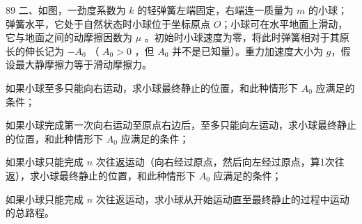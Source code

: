 \begin{problem}[第35届全国中学生物理竞赛复赛][弹簧振子与摩擦力]{89}
二、如图，一劲度系数为 $k$ 的轻弹簧左端固定，右端连一质量为 $m$ 的小球；弹簧水平，它处于自然状态时小球位于坐标原点 $O$；小球可在水平地面上滑动，它与地面之间的动摩擦因数为 $\mu$ 。初始时小球速度为零，将此时弹簧相对于其原长的伸长记为 $-A_{0}$ （ $A_{0}>0$ ，但 $A_{0}$ 并不是已知量）。重力加速度大小为 $g$，假设最大静摩擦力等于滑动摩擦力。
\begin{subproblem}
如果小球至多只能向右运动，求小球最终静止的位置，和此种情形下 $A_0$ 应满足的条件；
\end{subproblem}
\begin{subproblem}
如果小球完成第一次向右运动至原点右边后，至多只能向左运动，求小球最终静止的位置，和此种情形下 $A_{0}$ 应满足的条件；
\end{subproblem}
\begin{subproblem}
如果小球只能完成 $n$ 次往返运动（向右经过原点，然后向左经过原点，算1次往返），求小球最终静止的位置，和此种情形下 $A_{0}$ 应满足的条件；
\end{subproblem}
\begin{subproblem}
如果小球只能完成 $n$ 次往返运动，求小球从开始运动直至最终静止的过程中运动的总路程。
\end{subproblem}
\end{problem}

